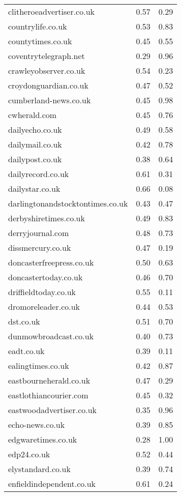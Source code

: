 \begin{longtable}{p{}p{}p{}}
  clitheroeadvertiser.co.uk & 0.57 & 0.29 \\ 
  countrylife.co.uk & 0.53 & 0.83 \\ 
  countytimes.co.uk & 0.45 & 0.55 \\ 
  coventrytelegraph.net & 0.29 & 0.96 \\ 
  crawleyobserver.co.uk & 0.54 & 0.23 \\ 
  croydonguardian.co.uk & 0.47 & 0.52 \\ 
  cumberland-news.co.uk & 0.45 & 0.98 \\ 
  cwherald.com & 0.45 & 0.76 \\ 
  dailyecho.co.uk & 0.49 & 0.58 \\ 
  dailymail.co.uk & 0.42 & 0.78 \\ 
  dailypost.co.uk & 0.38 & 0.64 \\ 
  dailyrecord.co.uk & 0.61 & 0.31 \\ 
  dailystar.co.uk & 0.66 & 0.08 \\ 
  darlingtonandstocktontimes.co.uk & 0.43 & 0.47 \\ 
  derbyshiretimes.co.uk & 0.49 & 0.83 \\ 
  derryjournal.com & 0.48 & 0.73 \\ 
  dissmercury.co.uk & 0.47 & 0.19 \\ 
  doncasterfreepress.co.uk & 0.50 & 0.63 \\ 
  doncastertoday.co.uk & 0.46 & 0.70 \\ 
  driffieldtoday.co.uk & 0.55 & 0.11 \\ 
  dromoreleader.co.uk & 0.44 & 0.53 \\ 
  dst.co.uk & 0.51 & 0.70 \\ 
  dunmowbroadcast.co.uk & 0.40 & 0.73 \\ 
  eadt.co.uk & 0.39 & 0.11 \\ 
  ealingtimes.co.uk & 0.42 & 0.87 \\ 
  eastbourneherald.co.uk & 0.47 & 0.29 \\ 
  eastlothiancourier.com & 0.45 & 0.32 \\ 
  eastwoodadvertiser.co.uk & 0.35 & 0.96 \\ 
  echo-news.co.uk & 0.39 & 0.85 \\ 
  edgwaretimes.co.uk & 0.28 & 1.00 \\ 
  edp24.co.uk & 0.52 & 0.44 \\ 
  elystandard.co.uk & 0.39 & 0.74 \\ 
  enfieldindependent.co.uk & 0.61 & 0.24 \\ 

\end{longtable}
